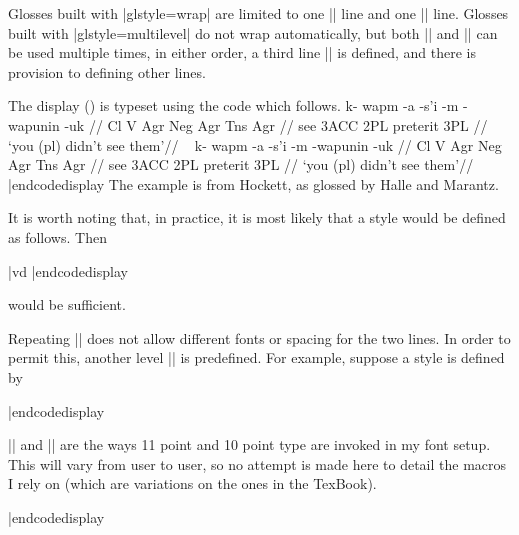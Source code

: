 \noindent Glosses built with |glstyle=wrap| are limited to one
|\gla| line and one |\glb| line.  Glosses built with
|glstyle=multilevel| do not wrap automatically, but both |\gla|
and |\glb| can be used multiple times, in either order, a third
line |\glc| is defined, and there is provision to defining other
lines.

The display (\nextx) is typeset using the code which follows.
\framedisplay
\ex[glstyle=multilevel,everygla=,everyglb=,everyglc=,
   aboveglaskip=0pt,aboveglbskip=0pt,aboveglftskip=1ex]
\begingl
\gla k- wapm -a -s'i -m -wapunin -uk //
\glb Cl V Agr Neg Agr Tns Agr //
 see {3\sc ACC} {} 2{\sc PL} preterit 3{\sc PL} //
\glft `you (pl) didn't see them'//
\endgl
\xe
\endframedisplay
\codedisplay~
\ex[glstyle=multilevel,everygla=,everyglb=,everyglc=,
   aboveglaskip=0pt,aboveglbskip=0pt,aboveglftskip=1ex]
\begingl
\gla k- wapm -a -s'i -m -wapunin -uk //
\glb Cl V Agr Neg Agr Tns Agr //
 see {3\sc ACC} {} 2{\sc PL} preterit 3{\sc PL} //
\glft `you (pl) didn't see them'//
\endgl
\xe
|endcodedisplay
The example is from Hockett, as glossed by Halle and
Marantz.

It is worth noting that, in practice, it is most likely that
a style would be defined as follows.
Then \def\vd{\hbox{$\qquad \vdots$}}
\codedisplay
{}

\ex[lingstyle=glabb]
\begingl
|vd
\endgl
\xe
|endcodedisplay

\noindent would be sufficient.

Repeating |\glb| does not allow different fonts or spacing for the two
lines.  In order to permit this, another level |\glc| is
predefined.  For example, suppose a style is defined by

\codedisplay
{}
|endcodedisplay

\noindent |\elevenpoint| and |\tenpoint| are the ways 11 point
and 10 point type are invoked in my font setup.  This will vary
from user to user, so no attempt is made here to detail the
macros I rely on (which are variations on the ones in the
TexBook).
\codedisplay

\def\tenpoint{\tenrm \let\sc\eightrm}%
\def\elevenpoint{\elevenrm}
|endcodedisplay

